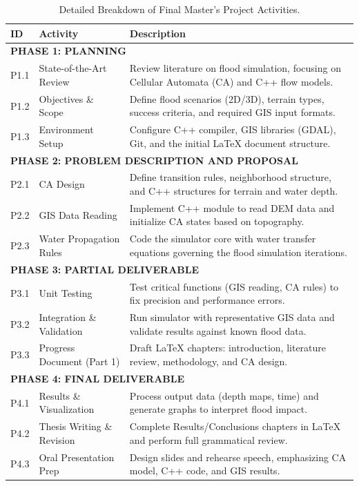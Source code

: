 \begin{table}[htbp]
\centering
\small %
\caption{Detailed Breakdown of Final Master's Project Activities.}
\label{tab:fmp_activities}
\begin{tabularx}{\textwidth}{l l X}
    \toprule
    \textbf{ID} & \textbf{Activity} & \textbf{Description} \\
    \midrule

    \multicolumn{3}{l}{\textbf{PHASE 1: PLANNING}} \\
    \midrule
    P1.1 & State-of-the-Art Review & Review literature on flood simulation, focusing on Cellular Automata (CA) and C++ flow models. \\
    P1.2 & Objectives \& Scope & Define flood scenarios (2D/3D), terrain types, success criteria, and required GIS input formats. \\
    P1.3 & Environment Setup & Configure C++ compiler, GIS libraries (GDAL), Git, and the initial LaTeX document structure. \\
    \midrule

    \multicolumn{3}{l}{\textbf{PHASE 2: PROBLEM DESCRIPTION AND PROPOSAL}} \\
    \midrule
    P2.1 & CA Design & Define transition rules, neighborhood structure, and C++ structures for terrain and water depth. \\
    P2.2 & GIS Data Reading & Implement C++ module to read DEM data and initialize CA states based on topography. \\
    P2.3 & Water Propagation Rules & Code the simulator core with water transfer equations governing the flood simulation iterations. \\
    \midrule

    \multicolumn{3}{l}{\textbf{PHASE 3: PARTIAL DELIVERABLE}} \\
    \midrule
    P3.1 & Unit Testing & Test critical functions (GIS reading, CA rules) to fix precision and performance errors. \\
    P3.2 & Integration \& Validation & Run simulator with representative GIS data and validate results against known flood data. \\
    P3.3 & Progress Document (Part 1) & Draft LaTeX chapters: introduction, literature review, methodology, and CA design. \\
    \midrule

    \multicolumn{3}{l}{\textbf{PHASE 4: FINAL DELIVERABLE}} \\
    \midrule
    P4.1 & Results \& Visualization & Process output data (depth maps, time) and generate graphs to interpret flood impact. \\
    P4.2 & Thesis Writing \& Revision & Complete Results/Conclusions chapters in LaTeX and perform full grammatical review. \\
    P4.3 & Oral Presentation Prep & Design slides and rehearse speech, emphasizing CA model, C++ code, and GIS results. \\
    \midrule


\end{tabularx}
\end{table}
